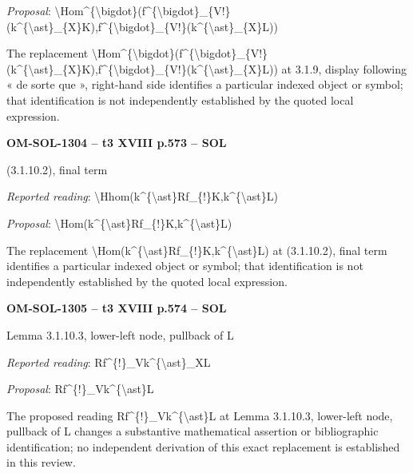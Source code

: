 \emph{Proposal}: \textbackslash{}Hom\textasciicircum{}\{\textbackslash{}bigdot\}(f\textasciicircum{}\{\textbackslash{}bigdot\}\_\{V!\}(k\textasciicircum{}\{\textbackslash{}ast\}\_\{X\}K),f\textasciicircum{}\{\textbackslash{}bigdot\}\_\{V!\}(k\textasciicircum{}\{\textbackslash{}ast\}\_\{X\}L))\par
The replacement \textbackslash{}Hom\textasciicircum{}\{\textbackslash{}bigdot\}(f\textasciicircum{}\{\textbackslash{}bigdot\}\_\{V!\}(k\textasciicircum{}\{\textbackslash{}ast\}\_\{X\}K),f\textasciicircum{}\{\textbackslash{}bigdot\}\_\{V!\}(k\textasciicircum{}\{\textbackslash{}ast\}\_\{X\}L)) at 3.1.9, display following « de sorte que », right-hand side identifies a particular indexed object or symbol; that identification is not independently established by the quoted local expression.\par
\par\noindent\textbf{OM-SOL-1304 -- t3 XVIII p.573 -- SOL}\par
(3.1.10.2), final term\par
\emph{Reported reading}: \textbackslash{}Hhom(k\textasciicircum{}\{\textbackslash{}ast\}Rf\_\{!\}K,k\textasciicircum{}\{\textbackslash{}ast\}L)\par
\emph{Proposal}: \textbackslash{}Hom(k\textasciicircum{}\{\textbackslash{}ast\}Rf\_\{!\}K,k\textasciicircum{}\{\textbackslash{}ast\}L)\par
The replacement \textbackslash{}Hom(k\textasciicircum{}\{\textbackslash{}ast\}Rf\_\{!\}K,k\textasciicircum{}\{\textbackslash{}ast\}L) at (3.1.10.2), final term identifies a particular indexed object or symbol; that identification is not independently established by the quoted local expression.\par
\par\noindent\textbf{OM-SOL-1305 -- t3 XVIII p.574 -- SOL}\par
Lemma 3.1.10.3, lower-left node, pullback of L\par
\emph{Reported reading}: Rf\textasciicircum{}\{!\}\_Vk\textasciicircum{}\{\textbackslash{}ast\}\_XL\par
\emph{Proposal}: Rf\textasciicircum{}\{!\}\_Vk\textasciicircum{}\{\textbackslash{}ast\}L\par
The proposed reading Rf\textasciicircum{}\{!\}\_Vk\textasciicircum{}\{\textbackslash{}ast\}L at Lemma 3.1.10.3, lower-left node, pullback of L changes a substantive mathematical assertion or bibliographic identification; no independent derivation of this exact replacement is established in this review.\par
